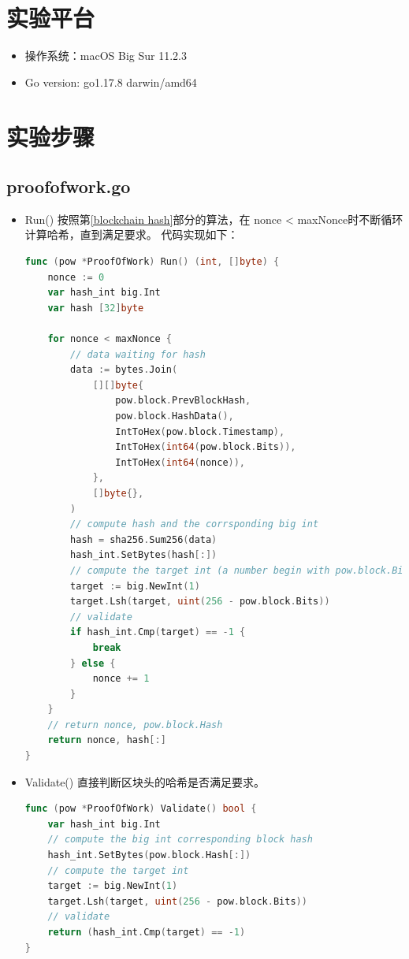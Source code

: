 \documentclass{article}
\begin{document}
    \section{实验平台}
    \begin{itemize}
        \item 操作系统：macOS Big Sur 11.2.3
        \item Go version: go1.17.8 darwin/amd64
    \end{itemize}
    \section{实验步骤}
    \subsection{\jetbrains proofofwork.go}
    \begin{itemize}
        \item {\jetbrains Run()}
        按照第\ref{blockchain hash}部分的算法，在 {\jetbrains nonce < maxNonce}时不断循环计算哈希，直到满足要求。
        代码实现如下：
        \begin{lstlisting}[language=go]
func (pow *ProofOfWork) Run() (int, []byte) {
	nonce := 0
	var hash_int big.Int
	var hash [32]byte

	for nonce < maxNonce {
		// data waiting for hash
		data := bytes.Join(
			[][]byte{
				pow.block.PrevBlockHash,
				pow.block.HashData(),
				IntToHex(pow.block.Timestamp),
				IntToHex(int64(pow.block.Bits)),
				IntToHex(int64(nonce)),
			},
			[]byte{},
		)
		// compute hash and the corrsponding big int
		hash = sha256.Sum256(data)
		hash_int.SetBytes(hash[:])
		// compute the target int (a number begin with pow.block.Bits zero in binary)
		target := big.NewInt(1)
		target.Lsh(target, uint(256 - pow.block.Bits))
		// validate
		if hash_int.Cmp(target) == -1 {
			break
		} else {
			nonce += 1
		}
	}
	// return nonce, pow.block.Hash
	return nonce, hash[:]
}
        \end{lstlisting}
        \item {\jetbrains Validate()}
        直接判断区块头的哈希是否满足要求。
        \begin{lstlisting}[language=go]
func (pow *ProofOfWork) Validate() bool {
	var hash_int big.Int
	// compute the big int corresponding block hash
	hash_int.SetBytes(pow.block.Hash[:])
	// compute the target int
	target := big.NewInt(1)
	target.Lsh(target, uint(256 - pow.block.Bits))	
	// validate
	return (hash_int.Cmp(target) == -1)
}
        \end{lstlisting}
    \end{itemize}
\end{document}
